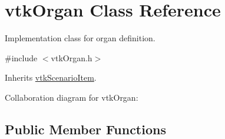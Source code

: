 \hypertarget{classvtkOrgan}{
\section{vtkOrgan Class Reference}
\label{classvtkOrgan}
}


Implementation class for organ definition.  




{\ttfamily \#include $<$vtkOrgan.h$>$}



Inherits \hyperlink{classvtkScenarioItem}{vtkScenarioItem}.



Collaboration diagram for vtkOrgan:\subsection*{Public Member Functions}
